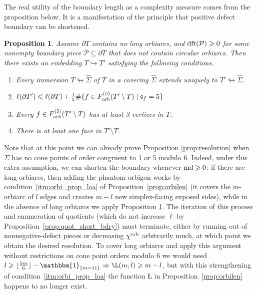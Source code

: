 \documentclass{amsart}
\newtheorem{proposition}[conjecture]{Proposition}
\newcommand{\cho}{\chi^{\textnormal{orb}}}
\newcommand{\dft}{\textnormal{dft}}
\newcommand{\Forb}[1][m]{F^{(#1)}_{\textnormal{orb}}}
\newcommand{\md}{\textnormal{md}}
\newcommand{\whS}{{\widehat{\Sigma}}}
\begin{document}
The real utility of the boundary length as a complexity measure comes from the proposition below. It is a manifestation of the principle that positive defect boundary can be shortened.
\begin{proposition}\label{prop:spackling_defect}
Assume $\partial T$ contains no long orbiarcs, and $\dft(\mathcal{P})\geqslant0$ for some nonempty boundary piece $\mathcal{P}\subseteq\partial T$ that does not contain circular orbiarcs. Then there exists an embedding $T\hookrightarrow T'$ satisfying the following conditions.
\begin{enumerate}
\item\label{itm:spackling_extension} Every immersion $T\looparrowright\whS$ of $T$ in a covering $\whS$ extends uniquely to $T'\looparrowright\whS$.
\item\label{itm:spackling_shorten} $\ell(\partial T')\leqslant\ell(\partial T)+\tfrac{1}{5}\#\{f\in\Forb[5](T'\setminus T)\mid\mathfrak{s}_f=5\}$
\item\label{itm:spackling_p5} Every $f\in\Forb[5](T'\setminus T)$ has at least 3 vertices in $T$.
\item\label{itm:spackling_nontriv} There is at least one face in $T'\setminus T$.
\end{enumerate}
\end{proposition}

Note that at this point we can already prove Proposition \ref{prop:resolution} when $\Sigma$ has no cone points of order congruent to 1 or 5 modulo 6. Indeed, under this extra assumption, we can shorten the boundary whenever $\md\geqslant0$: if there are long orbiarcs, then adding the phantom orbigon works by condition~\ref*{itm:orbi_prop_loa} of Proposition~\ref{prop:orbilen} (it covers the $m$-orbiarc of $l$ edges and creates $m-l$ new simplex-facing exposed sides), while in the absence of long orbiarcs we apply Proposition \ref{prop:spackling_defect}. The iteration of this process and enumeration of quotients (which do not increase $\ell$ by Proposition~\ref{prop:quot_short_bdry}) must terminate, either by running out of nonnegative-defect pieces or decreasing $\cho$ arbitrarily much, at which point we obtain the desired resolution. To cover long orbiarcs and apply this argument without restrictions on cone point orders modulo 6 we would need $l\geqslant\lfloor\tfrac{5m}{6}\rfloor-\mathbbm{1}_{\{m=11\}}\Rightarrow Ł(m,l)\geqslant m-l$, but with this strengthening of condition~\ref*{itm:orbi_prop_loa} the function $Ł$ in Proposition~\ref{prop:orbilen} happens to no longer exist.
\end{document}

